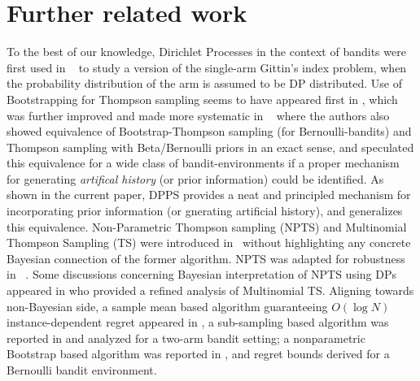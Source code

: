 \documentclass[10pt]{article}
\newtheorem{thm}{Theorem}
\def\E{\mathbb{E}}
\begin{document}








\section{Further related work}
\label{sec:Related works}

To the best of our knowledge, Dirichlet Processes in the context of bandits were first used in ~\citep{clayton1985bayesian} to study a version of the single-arm  Gittin's index problem, when the probability distribution of the arm is assumed to be DP distributed. Use of Bootstrapping for Thompson sampling seems to have appeared first in \cite{eckles2014thompson}, which was further improved and made more systematic in ~\citep{osband2015bootstrapped} where the authors also showed equivalence of Bootstrap-Thompson sampling (for Bernoulli-bandits) and Thompson sampling with Beta/Bernoulli priors in an exact sense, and speculated this equivalence for a wide class of bandit-environments if a proper mechanism for generating \textit{artifical history} (or prior information) could be identified. As shown in the current paper, DPPS provides a neat and principled mechanism for incorporating prior information (or gnerating artificial history), and generalizes this equivalence. Non-Parametric Thompson sampling (NPTS) and Multinomial Thompson Sampling (TS) were introduced in~\citep{riou2020bandit} without highlighting any concrete Bayesian connection of the former algorithm. NPTS was adapted for robustness in ~\citep{baudry2021optimality}. Some discussions concerning Bayesian interpretation of NPTS using DPs appeared in \cite{belomestny2023sharp} who provided a refined analysis of Multinomial TS.  Aligning towards non-Bayesian side,  a sample mean based algorithm guaranteeing $O(\log N)$ instance-dependent regret appeared in \cite{agrawal1995sample}, a sub-sampling based algorithm was reported in \cite{baransi2014sub} and analyzed for a two-arm bandit setting; a nonparametric Bootstrap based algorithm  was reported in \cite{kveton2019garbage}, and regret bounds derived for a Bernoulli bandit environment.
\end{document}
